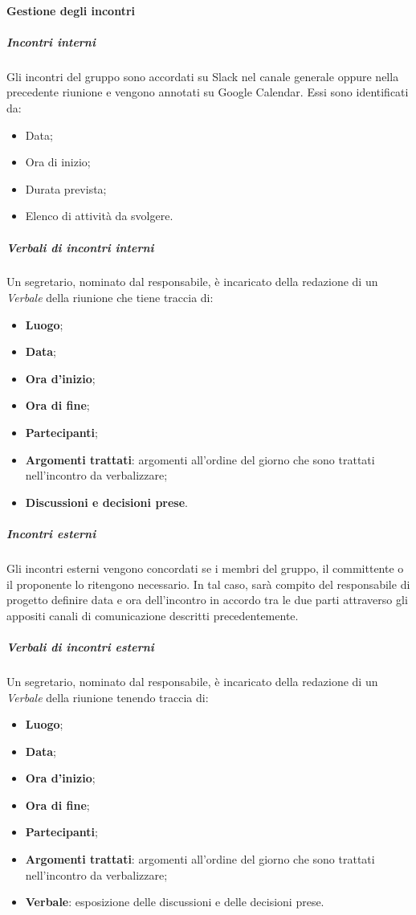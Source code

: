 			\paragraph{Gestione degli incontri}
				\subparagraph*{Incontri interni}
					Gli incontri del gruppo sono accordati su Slack nel canale generale oppure nella precedente riunione e vengono annotati su Google Calendar. Essi sono identificati da:
					\begin{itemize}
						\item Data;
						\item Ora di inizio;
						\item Durata prevista;
						\item Elenco di attività da svolgere.
					\end{itemize}
				\subparagraph*{Verbali di incontri interni}
					Un segretario, nominato dal responsabile, è incaricato della redazione di un \textit{Verbale} della riunione che tiene traccia di:
					\begin{itemize}
						\item \textbf{Luogo};
						\item \textbf{Data};
						\item \textbf{Ora d'inizio};
						\item \textbf{Ora di fine};
						\item \textbf{Partecipanti};
						\item \textbf{Argomenti trattati}: argomenti all'ordine del giorno che sono trattati nell'incontro da verbalizzare;
						\item \textbf{Discussioni e decisioni prese}.
					\end{itemize}
				\subparagraph*{Incontri esterni}
					Gli incontri esterni vengono concordati se i membri del gruppo, il committente o il proponente lo ritengono necessario. In tal caso, sarà compito del responsabile di progetto definire data e ora dell'incontro in accordo tra le due parti attraverso gli appositi canali di comunicazione descritti precedentemente.
				\subparagraph*{Verbali di incontri esterni}
					Un segretario, nominato dal responsabile, è incaricato della redazione di un \textit{Verbale} della riunione tenendo traccia di:
					\begin{itemize}
						\item \textbf{Luogo};
						\item \textbf{Data};
						\item \textbf{Ora d'inizio};
						\item \textbf{Ora di fine};
						\item \textbf{Partecipanti};
						\item \textbf{Argomenti trattati}: argomenti all'ordine del giorno che sono trattati nell'incontro da verbalizzare;
						\item \textbf{Verbale}: esposizione delle discussioni e delle decisioni prese.
					\end{itemize}
